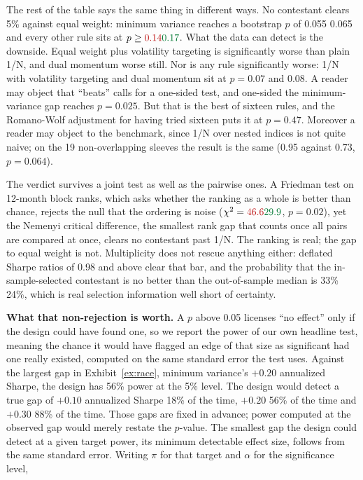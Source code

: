 \documentclass[12pt,letterpaper]{article}
\newcommand{\quita}[1]{{\color{quitarc}#1}}
\newcommand{\nuevo}[1]{{\color{nuevoc}#1}}
\newcommand{\head}[1]{\noindent\textbf{#1}\hspace{0.5em}\ignorespaces}
\begin{document}
The rest of the table says the same thing in different ways. No contestant clears 5\% against
equal weight: minimum variance reaches a bootstrap $p$ of \quita{0.055} \nuevo{0.065} and every other rule sits at
$p \ge \quita{0.14}\nuevo{0.17}$. \quita{What the data can detect is the downside. Equal weight plus volatility targeting
is significantly worse than plain 1/N, and dual momentum worse still.} \nuevo{Nor is any rule
significantly worse: 1/N with volatility targeting and dual momentum sit at $p = 0.07$ and $0.08$.
A reader may object that ``beats'' calls for a one-sided test, and one-sided the minimum-variance
gap reaches $p = 0.025$. But that is the best of sixteen rules, and the Romano-Wolf adjustment for
having tried sixteen puts it at $p = 0.47$. Moreover a reader may object to the benchmark, since 1/N
over nested indices is not quite naive; on the 19 non-overlapping sleeves the result is the same
(0.95 against 0.73, $p = 0.064$).}

The verdict survives a joint test as well as the pairwise ones. A Friedman test on 12-month
block ranks\nuevo{, which asks whether the ranking as a whole is better than chance,} rejects the null that the ordering is noise ($\chi^{2} = \quita{46.6}\nuevo{29.9}$\nuevo{, $p = 0.02$}), yet the Nemenyi
critical difference\nuevo{, the smallest rank gap that counts once all pairs are compared at
once,} clears no contestant past 1/N. The ranking is real; the gap to equal weight
is not. Multiplicity does not rescue anything either: deflated Sharpe ratios of 0.98 and above
clear that bar, and the probability that the in-sample-selected contestant is no better than
the out-of-sample median is \quita{33\%} \nuevo{24\%}, which is real selection information well short of
certainty.

\head{What that non-rejection is worth.} A $p$ above 0.05 licenses ``no effect''
only if the design could have found one, so we report the power of our own
headline test, meaning the chance it would have flagged an edge of that size as
significant had one really existed, computed on the same standard error the test
uses. \quita{Against the largest gap
in Exhibit~\ref{ex:race}, minimum variance's $+0.20$ annualized Sharpe, the design
has 56\% power at the 5\% level.} \nuevo{The design would detect a true
gap of $+0.10$ annualized Sharpe 18\% of the time, $+0.20$ 56\% of the time and $+0.30$ 88\% of the
time. Those gaps are fixed in advance; power computed at the observed gap would merely restate the
$p$-value.} The smallest gap the design could detect at a given target power, its minimum detectable effect size, follows from the same standard error. Writing $\pi$ for that target and $\alpha$ for the significance level,
\end{document}
